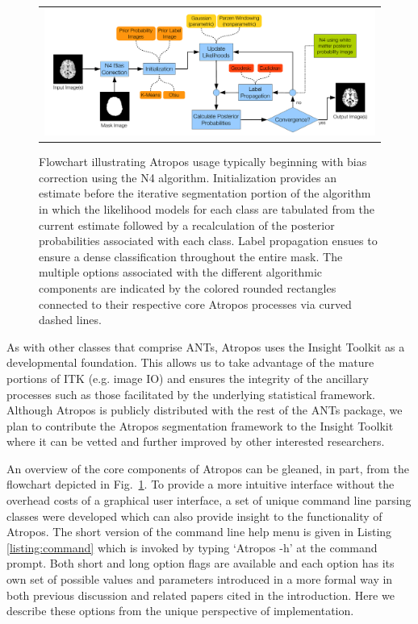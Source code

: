 \documentclass[11pt,english]{article}
\begin{document}
\begin{figure}
\begin{center}
\begin{tabular}{c}
\includegraphics[width=160mm]{AtroposFlowchart.pdf}
\end{tabular}
\caption{\baselineskip 12pt \small Flowchart illustrating Atropos usage typically beginning with bias correction using the N4 algorithm.  
Initialization provides an estimate before the iterative segmentation portion of the algorithm in which the 
likelihood models for each class are tabulated from the current estimate followed by a recalculation of the 
posterior probabilities associated with each class.  Label propagation ensues to ensure a dense 
classification throughout the entire mask.   The multiple options associated with the different algorithmic 
components are indicated by the colored rounded rectangles connected to their respective core Atropos 
processes via curved dashed lines.  }
\label{fig:flowchart}
\end{center}
\end{figure}

As with other classes that comprise ANTs, Atropos uses the Insight Toolkit as a developmental foundation.  
This allows us to take advantage of the mature portions of ITK (e.g. image IO) and ensures the 
integrity of the ancillary processes such as those facilitated by the underlying statistical framework.  Although Atropos is 
publicly distributed with the rest of the ANTs package, we plan to contribute the Atropos segmentation
framework to the Insight Toolkit where it can be vetted and further improved by other interested researchers.

An overview of the core components of Atropos can be gleaned, in part, from the flowchart depicted in 
Fig.~\ref{fig:flowchart}.  To provide a more intuitive interface without the overhead costs of a graphical user interface, a set of unique command line parsing classes were developed which can also provide insight to the functionality of Atropos.  
The short version of the command line help menu is given in Listing \ref{listing:command} which is invoked by typing `{\ttfamily Atropos -h}' at the command prompt.  Both short and long option flags are available and each option has its own set of possible values and parameters introduced in a more formal way in both previous discussion and related papers cited in the introduction.  Here we  describe these options from the unique perspective of  implementation.
\end{document}
